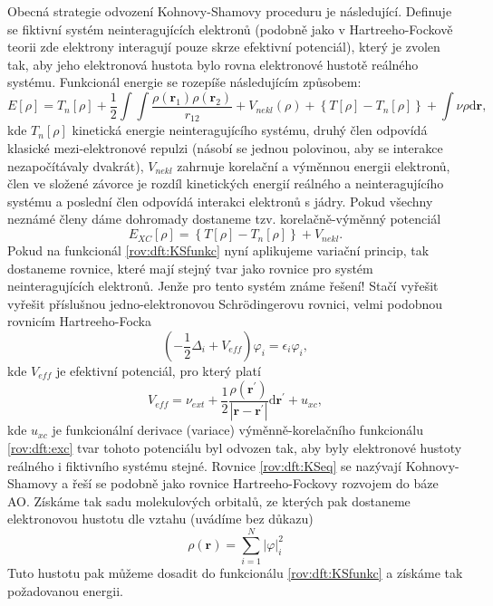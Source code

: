 Obecná strategie odvození Kohnovy-Shamovy proceduru je následující. Definuje se fiktivní systém neinteragujících elektronů (podobně jako v Hartreeho-Fockově teorii zde elektrony interagují pouze skrze efektivní potenciál), který je zvolen tak, aby jeho elektronová hustota bylo rovna elektronové hustotě reálného systému. 
Funkcionál energie se rozepíše následujícím způsobem:
\begin{equation}
E[\rho]= T_{n}[\rho] + \frac{1}{2}\int \int \frac{\rho(\textbf{r}_1)\rho(\textbf{r}_2)}{r_{12}} + V_{nekl}(\rho) +\left\lbrace T[\rho]-T_{n}[\rho]\right\rbrace + \int \nu \rho \mathrm{d}\textbf{r},
\label{rov:dft:KSfunkc}
\end{equation}
kde $T_{n}[\rho]$ kinetická energie neinteragujícího systému, druhý člen odpovídá klasické mezi-elektronové repulzi (násobí se jednou polovinou, aby se interakce nezapočítávaly dvakrát), $V_{nekl}$ zahrnuje korelační a výměnnou energii elektronů, člen ve složené závorce je rozdíl kinetických energií reálného a neinteragujícího systému  a poslední člen odpovídá interakci elektronů s jádry. Pokud všechny neznámé členy dáme dohromady dostaneme tzv. korelačně-výměnný potenciál
\begin{equation}	
E_{XC}[\rho]=\left\lbrace T[\rho]-T_{n}[\rho]\right\rbrace +  V_{nekl} .
\label{rov:dft:exc}
\end{equation}
Pokud na funkcionál \eqref{rov:dft:KSfunkc} nyní aplikujeme variační princip, tak dostaneme rovnice, které mají stejný tvar jako rovnice
pro systém neinteragujících elektronů. Jenže pro tento systém známe řešení! Stačí vyřešit vyřešit příslušnou jedno-elektronovou  	 Schr\"{o}dingerovu rovnici, velmi podobnou rovnicím Hartreeho-Focka
\begin{equation}
\left(-\frac{1}{2}\Delta_i + V_{eff} \right) \varphi_i =\epsilon_i \varphi_i ,
\label{rov:dft:KSeq}
\end{equation}
kde $V_{eff}$ je efektivní potenciál, pro který platí
\begin{equation}
V_{eff}=\nu_{ext}+\frac{1}{2}\frac{\rho(\textbf{r}^{\prime})}{|\textbf{r}-\textbf{r}^{\prime}|}\mathrm{d}\textbf{r}^{\prime}+u_{xc} ,
\end{equation}
kde $u_{xc}$ je funkcionální derivace (variace) výměnně-korelačního funkcionálu \ref{rov:dft:exc} tvar tohoto potenciálu byl odvozen tak, aby byly elektronové hustoty reálného i fiktivního systému stejné.
Rovnice \ref{rov:dft:KSeq} se nazývají Kohnovy-Shamovy a řeší se podobně jako rovnice Hartreeho-Fockovy rozvojem do báze AO.
Získáme tak sadu molekulových orbitalů, ze kterých pak dostaneme elektronovou hustotu dle vztahu (uvádíme bez důkazu)
\begin{equation}
\rho(\textbf{r}) = \sum_{i=1}^N |\varphi|_i^2
\label{rov:dft:KSrho}
\end{equation}
Tuto hustotu pak můžeme dosadit do funkcionálu \eqref{rov:dft:KSfunkc} a získáme tak požadovanou energii.

